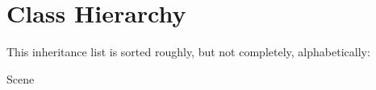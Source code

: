 \section{Class Hierarchy}
This inheritance list is sorted roughly, but not completely, alphabetically\+:\begin{DoxyCompactList}
\item {}
\item Scene\begin{DoxyCompactList}
\item {}
\end{DoxyCompactList}
\end{DoxyCompactList}
